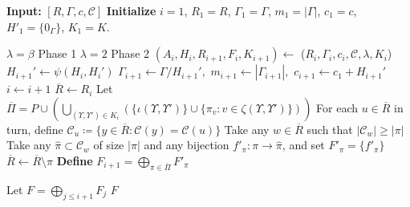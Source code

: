 \documentclass{article}
\newcommand{\cC}{\mathcal{C} }
\theoremstyle{definition}
\begin{document}
\begin{algorithm}[H]
\caption{Embedding-Algorithm
}\label{sub1}
\begin{algorithmic}[H]
\State \textbf{Input:} $[R,\Gamma,c,\cC]$   
\State \textbf{Initialize } $i = 1$, $R_1 = R$, $\Gamma_1 = \Gamma$, $m_1=|\Gamma|$, $c_1=c$, $H'_1 = \{0_\Gamma\}$, $K_1=K$.

    \State $\lambda=\beta$ \Comment Phase 1
\Else
    \State $\lambda=2$ \Comment Phase 2
\EndIf    
\State $(A_i,H_i,R_{i+1},F_i,K_{i+1})\gets$  ($R_i,\Gamma_i,c_i,\cC,\lambda,K_i$)
    \State $H_{i+1}' \gets \psi(H_i,H_i')$
    \State $\Gamma_{i+1} \gets \Gamma/H_{i+1}',$ \quad $m_{i+1} \gets |\Gamma_{i+1}|,$ \quad $c_{i+1}\gets c_1+H_{i+1}'$ 
    \State $i\gets i+1$
\EndWhile
\State $\overline R \gets R_i$
\State Let $\overline{\Pi} = P \cup \left(\bigcup_{(\Upsilon,\Upsilon')\in K_{i}}(\{\iota(\Upsilon,\Upsilon')\}\cup \{\pi_v:v\in \zeta(\Upsilon,\Upsilon')\})\right)$
\State For each $u\in \overline R$ in turn, define $\cC_u\coloneqq \{y\in \overline R:\cC(y)=\cC(u)\}$
\State Take any $w \in \overline R$ such that $|\cC_w|\geq |\pi|$
\State Take any $\hat{\pi}\subset \cC_w$ of size $|\pi|$ and any bijection $f'_\pi: \pi\to \hat{\pi}$, and set $F'_\pi = \{f'_\pi\}$
\State $\overline R \gets \overline R\setminus \hat{\pi}$
\EndFor 
\State \textbf{Define} $F_{i+1}=\bigoplus_{\pi\in \overline\Pi}F'_\pi$ 


\State Let $F=\bigoplus_{j\leq i+1} F_j$
\State \Return $F$


\end{algorithmic}
\end{algorithm}
\end{document}
